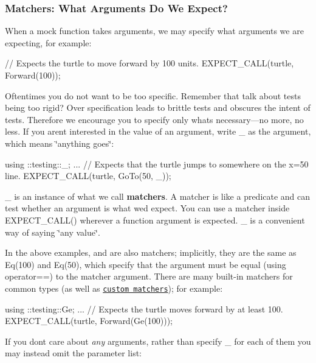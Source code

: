 \subsubsection*{Matchers\+: What Arguments Do We Expect?}

When a mock function takes arguments, we may specify what arguments we are expecting, for example\+:


\begin{DoxyCode}
\textcolor{comment}{// Expects the turtle to move forward by 100 units.}
EXPECT\_CALL(turtle, Forward(100));
\end{DoxyCode}


Oftentimes you do not want to be too specific. Remember that talk about tests being too rigid? Over specification leads to brittle tests and obscures the intent of tests. Therefore we encourage you to specify only what\textquotesingle{}s necessary—no more, no less. If you aren\textquotesingle{}t interested in the value of an argument, write {\ttfamily \+\_\+} as the argument, which means \char`\"{}anything goes\char`\"{}\+:


\begin{DoxyCode}
using ::testing::\_;
...
\textcolor{comment}{// Expects that the turtle jumps to somewhere on the x=50 line.}
EXPECT\_CALL(turtle, GoTo(50, \_));
\end{DoxyCode}


{\ttfamily \+\_\+} is an instance of what we call {\bfseries matchers}. A matcher is like a predicate and can test whether an argument is what we\textquotesingle{}d expect. You can use a matcher inside {\ttfamily E\+X\+P\+E\+C\+T\+\_\+\+C\+A\+L\+L()} wherever a function argument is expected. {\ttfamily \+\_\+} is a convenient way of saying \char`\"{}any value\char`\"{}.

In the above examples, {} and {} are also matchers; implicitly, they are the same as {\ttfamily Eq(100)} and {\ttfamily Eq(50)}, which specify that the argument must be equal (using {\ttfamily operator==}) to the matcher argument. There are many built-\/in matchers for common types (as well as \href{gmock_cook_book.md#NewMatchers}{\tt custom matchers}); for example\+:


\begin{DoxyCode}
using ::testing::Ge;
...
\textcolor{comment}{// Expects the turtle moves forward by at least 100.}
EXPECT\_CALL(turtle, Forward(Ge(100)));
\end{DoxyCode}


If you don\textquotesingle{}t care about {\itshape any} arguments, rather than specify {\ttfamily \+\_\+} for each of them you may instead omit the parameter list\+:


